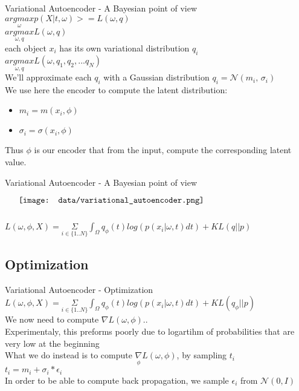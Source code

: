 \documentclass{beamer}
\begin{document}
\begin{frame}{Variational Autoencoder - A Bayesian point of view}
	$ \underset{\omega}{argmax} p(X|t, \omega) >= L(\omega,q) $ \\
        $ \underset{\omega,q}{argmax} L(\omega,q) $ \\
	each object $x_i$ has its own variational distribution $q_i$ \\
        $ \underset{\omega,q}{argmax} L(\omega,q_1, q_2, ... q_N) $ \\
	We'll approximate each $q_i$ with a Gaussian distribution $q_i = \mathcal{N}(m_i,\,\sigma_i)$ \\
	We use here the encoder to compute the latent distribution: \\
	\begin{itemize}
		\item $m_i = m(x_i, \phi)$
		\item $\sigma_i = \sigma(x_i, \phi)$
	\end{itemize}
	Thus $\phi$ is our encoder that from the input, compute the corresponding latent value.
\end{frame}

\begin{frame}{Variational Autoencoder - A Bayesian point of view}
    \begin{minipage}{5in}
    \centering
    $\vcenter{
    \texttt{[image: data/variational\_autoencoder.png]} \\
    }$
    \end{minipage}
    $ L(\omega, \phi, X)= \underset{i \in \{1..N\}}{\Sigma} \int_\Omega q_\phi(t) log( p(x_i | \omega, t) dt) + KL( q || p ) $
\end{frame}


\subsection{Optimization}
\begin{frame}{Variational Autoencoder - Optimization}
        $ L(\omega, \phi, X)= \underset{i \in \{1..N\}}{\Sigma} \int_\Omega q_\phi(t) log( p(x_i | \omega, t) dt) + KL( q_\phi || p ) $\\
	We now need to compute $\nabla L(\omega, \phi).$.\\
	Experimentaly, this preforms poorly due to logartihm of probabilities that are very low at the beginning\\
	What we do instead is to compute $\underset{\phi}{\nabla} L(\omega,\phi)$, by sampling $t_i$ \\
	$t_i = m_i + \sigma_i * \epsilon_i$ \\
	In order to be able to compute back propagation, we sample $\epsilon_i$ from  $\mathcal{N}(0,I)$
\end{frame}
\end{document}
